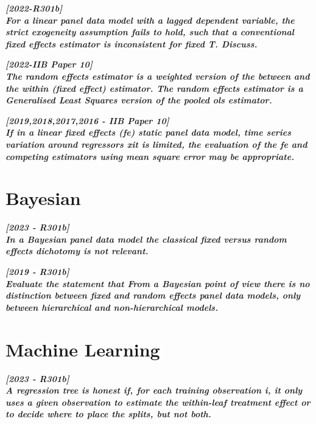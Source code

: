 \documentclass[DIV=14,titlepage=false]{scrreprt}
\begin{document}
\vspace{5pt}

\textbf{\textit{[2022-R301b] \\
For a linear panel data model with a lagged dependent variable, the strict exogeneity assumption fails to hold, such that a conventional fixed effects estimator is inconsistent for fixed T. Discuss.}}

\vspace{5pt}

\textbf{\textit{[2022-IIB Paper 10] \\
The random effects estimator is a weighted version of the between and the within (fixed effect) estimator. The random effects estimator is a Generalised Least Squares version of the pooled ols estimator.}}

\vspace{5pt}

\textbf{\textit{[2019,2018,2017,2016 - IIB Paper 10] \\
 If in a linear fixed effects (fe) static panel data model, time series variation around regressors xit is limited, the evaluation of the fe and competing estimators using mean square error may be appropriate.}}

\section*{Bayesian}

\textbf{\textit{[2023 - R301b] \\
In a Bayesian panel data model the classical fixed versus random effects dichotomy is not relevant.}}

\vspace{5pt}

\textbf{\textit{[2019 - R301b] \\
 Evaluate the statement that From a Bayesian point of view there is no distinction between fixed and random effects panel data models, only between hierarchical and non-hierarchical models.}}

\section*{Machine Learning}

\textbf{\textit{[2023 - R301b] \\
A regression tree is honest if, for each training observation i, it only uses a given observation to estimate the within-leaf treatment effect or to decide where to place the splits, but not both.}}
\end{document}
